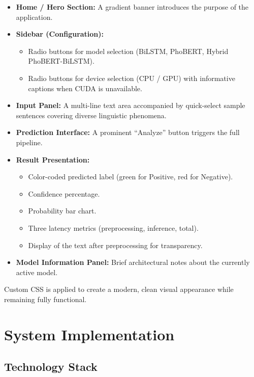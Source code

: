 \documentclass[12pt]{report} %
\begin{document}
\begin{itemize}
    \item \textbf{Home / Hero Section:} A gradient banner introduces the purpose of the application.
    \item \textbf{Sidebar (Configuration):}
          \begin{itemize}
              \item Radio buttons for model selection (BiLSTM, PhoBERT, Hybrid PhoBERT-BiLSTM).
              \item Radio buttons for device selection (CPU / GPU) with informative captions when CUDA is unavailable.
          \end{itemize}
    \item \textbf{Input Panel:} A multi-line text area accompanied by quick-select sample sentences covering diverse linguistic phenomena.
    \item \textbf{Prediction Interface:} A prominent ``Analyze'' button triggers the full pipeline.
    \item \textbf{Result Presentation:}
          \begin{itemize}
              \item Color-coded predicted label (green for Positive, red for Negative).
              \item Confidence percentage.
              \item Probability bar chart.
              \item Three latency metrics (preprocessing, inference, total).
              \item Display of the text after preprocessing for transparency.
          \end{itemize}
    \item \textbf{Model Information Panel:} Brief architectural notes about the currently active model.
\end{itemize}

Custom CSS is applied to create a modern, clean visual appearance while remaining fully functional.

\section{System Implementation}
\label{sec:system-implementation}

\subsection{Technology Stack}
\end{document}
